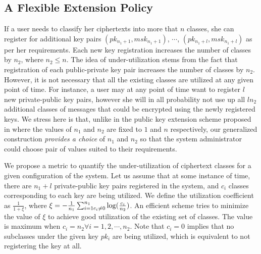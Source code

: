 \subsection{A Flexible Extension Policy}
\label{subsec:extension}

If a user needs to classify her ciphertexts into more that $n$ classes, she can register for additional key pairs $(pk_{n_1+1},msk_{n_1+1})$, $\cdots$, $(pk_{n_1+l},msk_{n_1+l})$ as per her requirements. Each new key registration increases the number of classes by $n_2$, where $n_2\leq n$. The idea of under-utilization stems from the fact that registration of each public-private key pair increases the number of classes by $n_2$. However, it is not necessary that all the existing classes are utilized at any given point of time. For instance, a user may at any point of time want to register $l$ new private-public key pairs, however she will in all probability not use up all $ln_2$ additional classes of messages that could be encrypted using the newly registered keys. We stress here is that, unlike in the public key extension scheme proposed in \cite{chu2014key} where the values of $n_1$ and $n_2$ are fixed to $1$ and $n$ respectively, our generalized construction \emph{provides a choice} of $n_1$ and $n_2$ so that the system administrator could choose pair of values suited to their requirements. 

We propose a metric to quantify the under-utilization of ciphertext classes for a given configuration of the system. Let us assume that at some instance of time, there are $n_1+l$ private-public key pairs registered in the system, and $c_i$ classes corresponding to each key are being utilized. We define the utilization coefficient as $\frac{1}{1+\xi}$, where $\xi=-\frac{1}{n_1}\sum_{i=1\\c_i\neq0}^{n_1}\log(\frac{c_i}{n_2})$. An efficient scheme tries to minimize the value of $\xi$ to achieve good utilization of the existing set of classes. The value is maximum when $c_i=n_2 \forall i=1,2,\cdots,n_2$. Note that $c_i=0$ implies that no subclasses under the given key $pk_i$ are being utilized, which is equivalent to not registering the key at all.        


